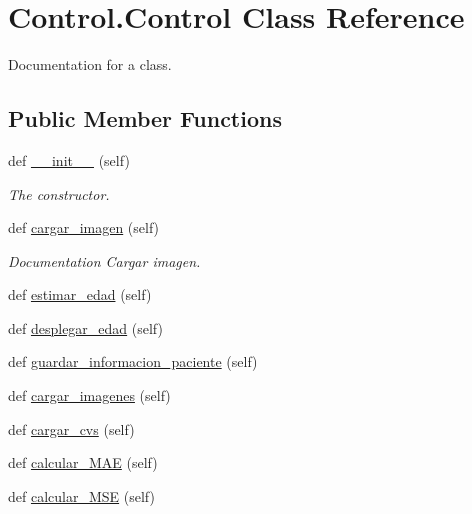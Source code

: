 \hypertarget{class_control_1_1_control}{}\section{Control.\+Control Class Reference}
\label{class_control_1_1_control}


Documentation for a class.  


\subsection*{Public Member Functions}
\begin{DoxyCompactItemize}
\item 
def \mbox{\hyperlink{class_control_1_1_control_acbf9737a141c25fda2909c24f68cb75e}{\+\_\+\+\_\+init\+\_\+\+\_\+}} (self)
\begin{DoxyCompactList}\small\item\em The constructor. \end{DoxyCompactList}\item 
def \mbox{\hyperlink{class_control_1_1_control_ab893f9803dde0fb16e273b4c718352b7}{cargar\+\_\+imagen}} (self)
\begin{DoxyCompactList}\small\item\em Documentation Cargar imagen. \end{DoxyCompactList}\item 
def \mbox{\hyperlink{class_control_1_1_control_a214b0abae8fa56b8a6e4dae3cd053e7d}{estimar\+\_\+edad}} (self)
\item 
def \mbox{\hyperlink{class_control_1_1_control_a5c05a607e82b93298524f090feaa2397}{desplegar\+\_\+edad}} (self)
\item 
def \mbox{\hyperlink{class_control_1_1_control_a0dc2a9739a717d5ff1163b803ddb8b26}{guardar\+\_\+informacion\+\_\+paciente}} (self)
\item 
def \mbox{\hyperlink{class_control_1_1_control_a75e5202cfb3776a4d9d88ff00db4518a}{cargar\+\_\+imagenes}} (self)
\item 
def \mbox{\hyperlink{class_control_1_1_control_a22f09f13d6a7128fc4ec24d4dfb52ed5}{cargar\+\_\+cvs}} (self)
\item 
def \mbox{\hyperlink{class_control_1_1_control_a01b94321309bbd777b1d147559ba8163}{calcular\+\_\+\+M\+AE}} (self)
\item 
def \mbox{\hyperlink{class_control_1_1_control_ae634564c3406e0fe8fe8cc1e53f8a924}{calcular\+\_\+\+M\+SE}} (self)
\end{DoxyCompactItemize}


